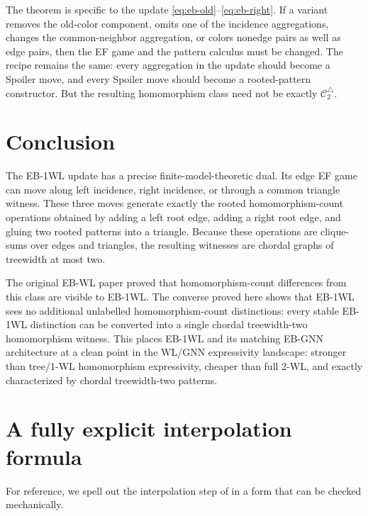 \documentclass[11pt]{article}
\newcommand{\cC}{\mathcal{C}}
\begin{document}
The theorem is specific to the update \eqref{eq:eb-old}--\eqref{eq:eb-right}.  If a variant removes the old-color component, omits one of the incidence aggregations, changes the common-neighbor aggregation, or colors nonedge pairs as well as edge pairs, then the EF game and the pattern calculus must be changed.  The recipe remains the same: every aggregation in the update should become a Spoiler move, and every Spoiler move should become a rooted-pattern constructor.  But the resulting homomorphism class need not be exactly $\cC_2^\triangle$.

\section{Conclusion}

The EB-1WL update has a precise finite-model-theoretic dual.  Its edge EF game can move along left incidence, right incidence, or through a common triangle witness.  These three moves generate exactly the rooted homomorphism-count operations obtained by adding a left root edge, adding a right root edge, and gluing two rooted patterns into a triangle.  Because these operations are clique-sums over edges and triangles, the resulting witnesses are chordal graphs of treewidth at most two.

The original EB-WL paper proved that homomorphism-count differences from this class are visible to EB-1WL.  The converse proved here shows that EB-1WL sees no additional unlabelled homomorphism-count distinctions: every stable EB-1WL distinction can be converted into a single chordal treewidth-two homomorphism witness.  This places EB-1WL and its matching EB-GNN architecture at a clean point in the WL/GNN expressivity landscape: stronger than tree/1-WL homomorphism expressivity, cheaper than full 2-WL, and exactly characterized by chordal treewidth-two patterns.

\appendix

\section{A fully explicit interpolation formula}
\label{app:interpolation}

For reference, we spell out the interpolation step of  in a form that can be checked mechanically.
\end{document}

